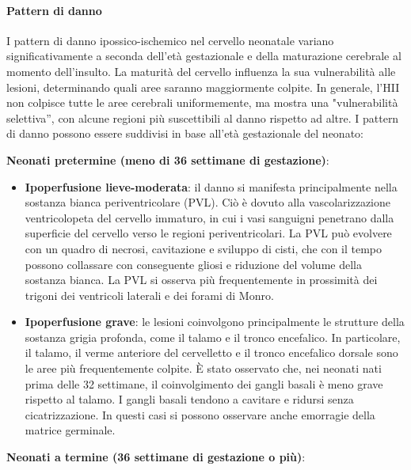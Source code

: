 \paragraph{Pattern di danno} I pattern di danno ipossico-ischemico nel cervello neonatale variano significativamente a seconda dell'età gestazionale e della maturazione cerebrale al momento dell'insulto. La maturità del cervello influenza la sua vulnerabilità alle lesioni, determinando quali aree saranno maggiormente colpite. In generale, l'HII non colpisce tutte le aree cerebrali uniformemente, ma mostra una "vulnerabilità selettiva'', con alcune regioni più suscettibili al danno rispetto ad altre. I pattern di danno possono essere suddivisi in base all'età gestazionale del neonato:

\textbf{Neonati pretermine (meno di 36 settimane di gestazione)}:

\begin{itemize}
	\tightlist
	\item
	\textbf{Ipoperfusione lieve-moderata}: il danno si manifesta principalmente nella sostanza bianca periventricolare (PVL). Ciò è dovuto alla vascolarizzazione ventricolopeta del cervello immaturo, in cui i vasi sanguigni penetrano dalla superficie del cervello verso le regioni periventricolari. La PVL può evolvere con un quadro di necrosi, cavitazione e sviluppo di cisti, che con il tempo possono collassare con conseguente gliosi e riduzione del volume della sostanza bianca. La PVL si osserva più frequentemente in prossimità dei trigoni dei ventricoli laterali e dei forami di Monro.
	\item
	\textbf{Ipoperfusione grave}: le lesioni coinvolgono principalmente le strutture della sostanza grigia profonda, come il talamo e il tronco encefalico. In particolare, il talamo, il verme anteriore del cervelletto e il tronco encefalico dorsale sono le aree più frequentemente colpite. È stato osservato che, nei neonati nati prima delle 32 settimane, il coinvolgimento dei gangli basali è meno grave rispetto al talamo. I gangli basali tendono a cavitare e ridursi senza cicatrizzazione. In questi casi si possono osservare anche emorragie della matrice germinale.
\end{itemize}

\textbf{Neonati a termine (36 settimane di gestazione o più)}:

